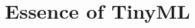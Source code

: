 \documentclass[../main]{subfiles}
\begin{document}
\chapter{Essence of TinyML} \label{chp:}






\end{document}

